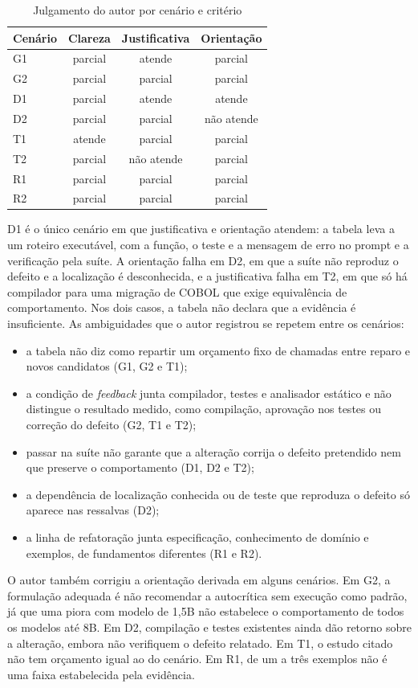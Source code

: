 \begin{table}[!t]
\caption{Julgamento do autor por cenário e critério}\label{tab:julgamento}
\centering\scriptsize
\begin{tabular}{@{}lccc@{}}
\hline
Cenário & Clareza & Justificativa & Orientação\\
\hline
G1 & parcial & atende & parcial\\
G2 & parcial & parcial & parcial\\
D1 & parcial & atende & atende\\
D2 & parcial & parcial & não atende\\
T1 & atende & parcial & parcial\\
T2 & parcial & não atende & parcial\\
R1 & parcial & parcial & parcial\\
R2 & parcial & parcial & parcial\\
\hline
\end{tabular}
\end{table}

D1 é o único cenário em que justificativa e orientação atendem: a tabela leva a um roteiro executável, com a
função, o teste e a mensagem de erro no prompt e a verificação pela suíte. A orientação falha em D2, em que a
suíte não reproduz o defeito e a localização é desconhecida, e a justificativa falha em T2, em que só há compilador
para uma migração de COBOL que exige equivalência de comportamento. Nos dois casos, a tabela não declara que a
evidência é insuficiente. As ambiguidades que o autor registrou se repetem entre os cenários:
\begin{itemize}
  \item a tabela não diz como repartir um orçamento fixo de chamadas entre reparo e novos candidatos (G1, G2 e T1);
  \item a condição de \textit{feedback} junta compilador, testes e analisador estático e não distingue o resultado
  medido, como compilação, aprovação nos testes ou correção do defeito (G2, T1 e T2);
  \item passar na suíte não garante que a alteração corrija o defeito pretendido nem que preserve o comportamento
  (D1, D2 e T2);
  \item a dependência de localização conhecida ou de teste que reproduza o defeito só aparece nas ressalvas (D2);
  \item a linha de refatoração junta especificação, conhecimento de domínio e exemplos, de fundamentos diferentes
  (R1 e R2).
\end{itemize}
O autor também corrigiu a orientação derivada em alguns cenários. Em G2, a formulação adequada é não recomendar a
autocrítica sem execução como padrão, já que uma piora com modelo de 1,5B não estabelece o comportamento de todos
os modelos até 8B. Em D2, compilação e testes existentes ainda dão retorno sobre a alteração, embora não verifiquem
o defeito relatado. Em T1, o estudo citado não tem orçamento igual ao do cenário. Em R1, de um a três exemplos não
é uma faixa estabelecida pela evidência.

